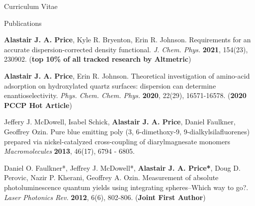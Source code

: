 \documentclass[a4paper,oneside,11pt]{article}
\begin{document}
\begin{cv}{Curriculum Vitae}
\begin{cvlist}{Publications}
          \item[4.] {\bf Alastair J. A. Price}, Kyle R. Bryenton, Erin R. Johnson. Requirements for an accurate dispersion-corrected density functional. {\it J. Chem. Phys.} {\bf 2021}, 154(23), 230902. ({\bf top 10\% of all tracked research by Altmetric})
          \item[3.] {\bf Alastair J. A. Price}, Erin R. Johnson. Theoretical investigation of amino-acid adsorption on hydroxylated quartz surfaces: dispersion can determine enantioselectivity. {\it Phys. Chem. Chem. Phys.} {\bf 2020}, 22(29), 16571-16578. ({\bf 2020 PCCP Hot Article})
          \item[2.] Jeffery J. McDowell, Isabel Schick, {\bf Alastair J. A. Price}, Daniel Faulkner, Geoffrey Ozin. Pure blue emitting poly (3, 6-dimethoxy-9, 9-dialkylsilafluorenes) prepared via nickel-catalyzed cross-coupling of diarylmagnesate monomers {\it Macromolecules} {\bf 2013}, 46(17), 6794 - 6805.
          \item[1.] Daniel O. Faulkner*, Jeffrey J. McDowell*, {\bf Alastair J. A. Price*}, Doug D. Perovic, Nazir P. Kherani, Geoffrey A. Ozin. Measurement of absolute photoluminescence quantum yields using integrating spheres–Which way to go?. {\it Laser Photonics Rev.} {\bf 2012}, 6(6), 802-806. ({\bf * Joint First Author})
  \end{cvlist}


\end{cv}
\end{document}
